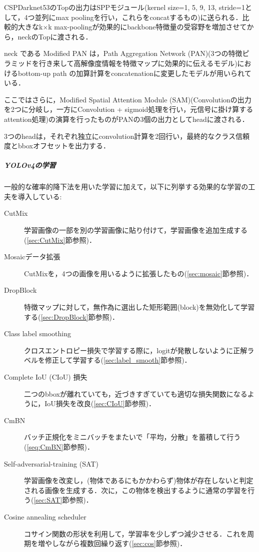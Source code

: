 \documentclass[twocolumn]{jsarticle} %
\begin{document}
CSPDarknet53のTopの出力はSPPモジュール(kernel size={1, 5, 9, 13}, stride=1として，4つ並列にmax poolingを行い，これらをconcatするもの)に送られる．比較的大きなk${\times}$k max-poolingが効果的にbackbone特徴量の受容野を増加させてから，neckのTopに渡される．

neck である Modified PAN は，Path Aggregation Network (PAN)(3つの特徴ピラミッドを行き来して高解像度情報を特徴マップに効果的に伝えるモデル)におけるbottom-up path の加算計算をconcatenationに変更したモデルが用いられている．

ここではさらに，Modified Spatial Attention Module (SAM)(Convolutionの出力を2つに分岐し，一方にConvolution + sigmoid処理を行い，元信号に掛け算するattention処理)の演算を行ったものがPANの3個の出力としてheadに渡される．

3つのheadは，それぞれ独立にconvolution計算を2回行い，最終的なクラス信頼度とbboxオフセットを出力する．

\subparagraph{YOLOv4の学習}一般的な確率的降下法を用いた学習に加えて，以下に列挙する効果的な学習の工夫を導入している: 

\begin{description}
    \item[CutMix] 学習画像の一部を別の学習画像に貼り付けて，学習画像を追加生成する(\ref{sec:CutMix}節参照)．
    \item[Mosaicデータ拡張] CutMixを，4つの画像を用いるように拡張したもの(\ref{sec:mosaic}節参照)．
    \item[DropBlock] 特徴マップに対して，無作為に選出した矩形範囲(block)を無効化して学習する(\ref{sec:DropBlock}節参照)．
    \item[Class label smoothing] クロスエントロピー損失で学習する際に，logitが発散しないように正解ラベルを修正して学習する(\ref{sec:label_smooth}節参照)．
    \item[Complete IoU (CIoU) 損失] 二つのbboxが離れていても，近づきすぎていても適切な損失関数になるように，IoU損失を改良(\ref{sec:CIoU}節参照)．
    \item[CmBN] バッチ正規化をミニバッチをまたいで「平均，分散」を蓄積して行う(\ref{seq:CmBN}節参照)．
    \item[Self-adversarial-training (SAT)] 学習画像を改変し，(物体であるにもかかわらず)物体が存在しないと判定される画像を生成する．次に，この物体を検出するように通常の学習を行う(\ref{sec:SAT}節参照)．
    \item[Cosine annealing scheduler] コサイン関数の形状を利用して，学習率を少しずつ減少させる．これを周期を増やしながら複数回繰り返す(\ref{sec:cos}節参照)．
\end{description}
\end{document}
